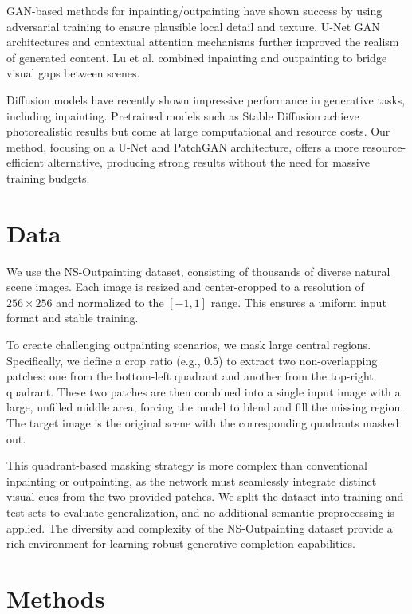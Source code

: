 \documentclass[sigconf]{acmart}
\begin{document}
GAN-based methods for inpainting/outpainting \cite{Isola2017,Yu2018,Yang2019} have shown success by using adversarial training to ensure plausible local detail and texture. U-Net GAN architectures \cite{Ronneberger2015} and contextual attention mechanisms further improved the realism of generated content. Lu et al. \cite{Lu2021} combined inpainting and outpainting to bridge visual gaps between scenes.

Diffusion models \cite{Lugmayr2022,Rombach2022} have recently shown impressive performance in generative tasks, including inpainting. Pretrained models such as Stable Diffusion achieve photorealistic results but come at large computational and resource costs. Our method, focusing on a U-Net and PatchGAN architecture, offers a more resource-efficient alternative, producing strong results without the need for massive training budgets.

\section*{Data}

We use the NS-Outpainting dataset, consisting of thousands of diverse natural scene images. Each image is resized and center-cropped to a resolution of $256 \times 256$ and normalized to the $[-1,1]$ range. This ensures a uniform input format and stable training.

To create challenging outpainting scenarios, we mask large central regions. Specifically, we define a crop ratio (e.g., $0.5$) to extract two non-overlapping patches: one from the bottom-left quadrant and another from the top-right quadrant. These two patches are then combined into a single input image with a large, unfilled middle area, forcing the model to blend and fill the missing region. The target image is the original scene with the corresponding quadrants masked out.

This quadrant-based masking strategy is more complex than conventional inpainting or outpainting, as the network must seamlessly integrate distinct visual cues from the two provided patches. We split the dataset into training and test sets to evaluate generalization, and no additional semantic preprocessing is applied. The diversity and complexity of the NS-Outpainting dataset provide a rich environment for learning robust generative completion capabilities.


\section*{Methods}
\end{document}

